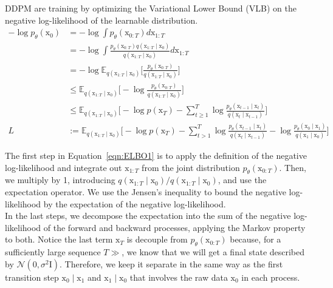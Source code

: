 DDPM are training by optimizing the Variational Lower Bound (VLB)
on the negative log-likelihood of the learnable distribution.
\begin{equation}\label{eqn:ELBO1}
    \begin{split} 
        -\log p_{\theta}(\mathrm{x}_{0}) &= -\log\int p_{\theta}(\mathrm{x}_{0:T}) d\mathrm{x}_{1:T} \\
        &= -\log \int \frac{p_{\theta}(\mathrm{x}_{0:T})q(\mathrm{x}_{1:T}\mid\mathrm{x}_{0})}{q(\mathrm{x}_{1:T}\mid\mathrm{x}_{0})}d\mathrm{x}_{1:T} \\
        &= - \log \mathbb{E}_{q(\mathrm{x}_{1:T}\mid\mathrm{x}_0)} \bigg[\frac{p_{\theta}(\mathrm{x}_{0:T})}{q(\mathrm{x}_{1:T}\mid\mathrm{x}_{0})} \bigg] \\
        & \leq \mathbb{E}_{q(\mathrm{x}_{1:T}\mid\mathrm{x}_{0})}\bigg[-\log \frac{p_{\theta}(\mathrm{x}_{0:T})}{q(\mathrm{x}_{1:T}\mid\mathrm{x}_{0})}\bigg] \\
        &\leq \mathbb{E}_{q(\mathrm{x}_{1:T}\mid\mathrm{x}_{0})}\bigg[-\log p(\mathrm{x}_{T}) - \sum_{t\geq 1}^{T} \log\frac{p_{\theta}(\mathrm{x}_{t-1}\mid\mathrm{x}_{t})}{q(\mathrm{x}_{t}\mid\mathrm{x}_{t-1})} \bigg] \\
        L &:= \mathbb{E}_{q(\mathrm{x}_{1:T}\mid\mathrm{x}_{0})}\bigg[-\log p(\mathrm{x}_{T}) - \sum_{t>1}^{T} \log \frac{p_{\theta}(\mathrm{x}_{t-1}\mid\mathrm{x}_{t})}{q(\mathrm{x}_{t}\mid\mathrm{x}_{t-1})}-\log\frac{p_{\theta}(\mathrm{x}_{0}\mid\mathrm{x}_{1})}{q(\mathrm{x}_{1}\mid\mathrm{x}_{0})}\bigg]
    \end{split}
\end{equation}

\noindent The first step in Equation~\ref{eqn:ELBO1} is to apply the definition of the negative log-likelihood and integrate out $\mathrm{x}_{1:T}$ from the
joint distribution $p_{\theta}(\mathrm{x}_{0:T})$. Then, we multiply by 1,
introducing $q(\mathrm{x}_{1:T}\mid\mathrm{x}_{0})/q(\mathrm{x}_{1:T}\mid\mathrm{x}_{0})$, and use the expectation operator. We use the Jensen's inequality to bound the negative log-likelihood by the expectation of the negative log-likelihood. \\

\noindent In the last steps, we decompose the expectation into the sum of the negative log-likelihood of the forward and backward processes, applying the Markov property to both. Notice the last term $\mathrm{x}_{T}$ is decouple from $p_{\theta}(\mathrm{x}_{0:T})$ because, for a sufficiently large sequence $T\gg$, we know that we will get a final state described by $\mathcal{N}(0, \sigma^2\mathrm{I})$. Therefore, we keep it separate in the same way as the first transition step $\mathrm{x}_{0}\mid\mathrm{x_{1}}$ and $\mathrm{x}_1\mid\mathrm{x}_0$ that involves the raw data $\mathrm{x}_{0}$ in each process.\\
    
